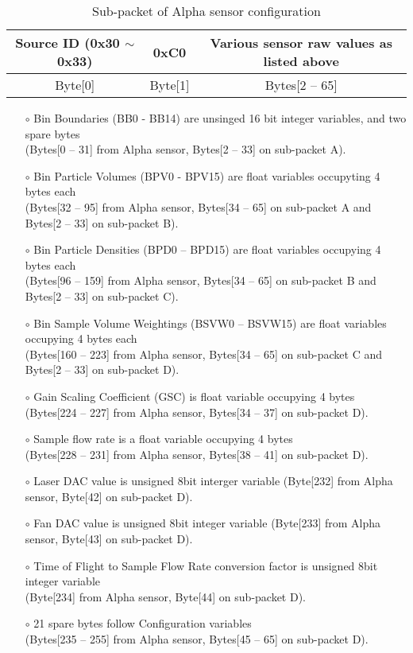 \begin{table}[h!]
    \centering
    \caption{Sub-packet of Alpha sensor configuration}
    \begin{tabular}{|c|c|c|}
        \hline
        \rowcolor{black!8}
        \textbf{Source ID} (0x30 $\sim$ 0x33) & \textbf{0xC0} & \textbf{Various sensor raw values as listed above}\\
        \hline
        Byte[0] & Byte[1] & Bytes[2 -- 65] \\ \hline
    \end{tabular}
\end{table}


\begin{itemize}
\setlength\itemsep{0em}
\item[$\circ$] Bin Boundaries (BB0 - BB14) are unsinged 16 bit integer variables, and two spare bytes \\
(Bytes[0 -- 31] from Alpha sensor, Bytes[2 -- 33] on sub-packet A).
\item[$\circ$] Bin Particle Volumes (BPV0 - BPV15) are float variables occupyting 4 bytes each \\
(Bytes[32 -- 95] from Alpha sensor, Bytes[34 -- 65] on sub-packet A and Bytes[2 -- 33] on sub-packet B).
\item[$\circ$] Bin Particle Densities (BPD0 -- BPD15) are float variables occupying 4 bytes each \\
(Bytes[96 -- 159] from Alpha sensor, Bytes[34 -- 65] on sub-packet B and Bytes[2 -- 33] on sub-packet C).
\item[$\circ$] Bin Sample Volume Weightings (BSVW0 -- BSVW15) are float variables occupying 4 bytes each \\
(Bytes[160 -- 223] from Alpha sensor, Bytes[34 -- 65] on sub-packet C and Bytes[2 -- 33] on sub-packet D).
\item[$\circ$] Gain Scaling Coefficient (GSC) is float variable occupying 4 bytes \\
(Bytes[224 -- 227] from Alpha sensor, Bytes[34 -- 37] on sub-packet D).
\item[$\circ$] Sample flow rate is a float variable occupying 4 bytes \\
(Bytes[228 -- 231] from Alpha sensor, Bytes[38 -- 41] on sub-packet D).
\item[$\circ$] Laser DAC value is unsigned 8bit interger variable
(Byte[232] from Alpha sensor, Byte[42] on sub-packet D).
\item[$\circ$] Fan DAC value is unsigned 8bit integer variable
(Byte[233] from Alpha sensor, Byte[43] on sub-packet D).
\item[$\circ$] Time of Flight to Sample Flow Rate conversion factor is unsigned 8bit integer variable \\
(Byte[234] from Alpha sensor, Byte[44] on sub-packet D).
\item[$\circ$] 21 spare bytes follow Configuration variables \\
(Bytes[235 -- 255] from Alpha sensor, Bytes[45 -- 65] on sub-packet D).
\end{itemize}


